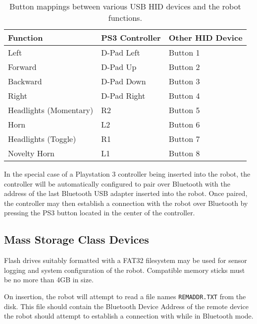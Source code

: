 \begin{table}[H]
	\begin{center}
		\begin{tabular}{ | l | l | l |}
			\hline
			\textbf{Function}		& \textbf{PS3 Controller}	& \textbf{Other HID Device} \\ \hline

			Left					& D-Pad Left				& Button 1	\\ \hline
			Forward					& D-Pad Up					& Button 2	\\ \hline
			Backward				& D-Pad Down				& Button 3	\\ \hline
			Right					& D-Pad Right				& Button 4	\\ \hline
			Headlights (Momentary)	& R2						& Button 5	\\ \hline
			Horn					& L2						& Button 6	\\ \hline
			Headlights (Toggle)		& R1						& Button 7	\\ \hline
			Novelty Horn			& L1						& Button 8	\\ \hline

		\end{tabular}
		\caption[USB HID Robot Button Mappings]{Button mappings between various USB HID devices and the robot functions.}
		\label{tab:robotbuttonmappings}
	\end{center}
\end{table}

In the special case of a Playstation 3 controller being inserted into the robot, the controller will be automatically configured to pair over Bluetooth with the address of the last Bluetooth USB adapter inserted into the robot. Once paired, the controller may then establish a connection with the robot over Bluetooth by pressing the PS3 button located in the center of the controller.

\subsection{Mass Storage Class Devices}

Flash drives suitably formatted with a FAT32 filesystem may be used for sensor logging and system configuration of the robot. Compatible memory sticks must be no more than 4GB in size.

On insertion, the robot will attempt to read a file names \texttt{REMADDR.TXT} from the disk. This file should contain the Bluetooth Device Address of the remote device the robot should attempt to establish a connection with while in Bluetooth mode. 

